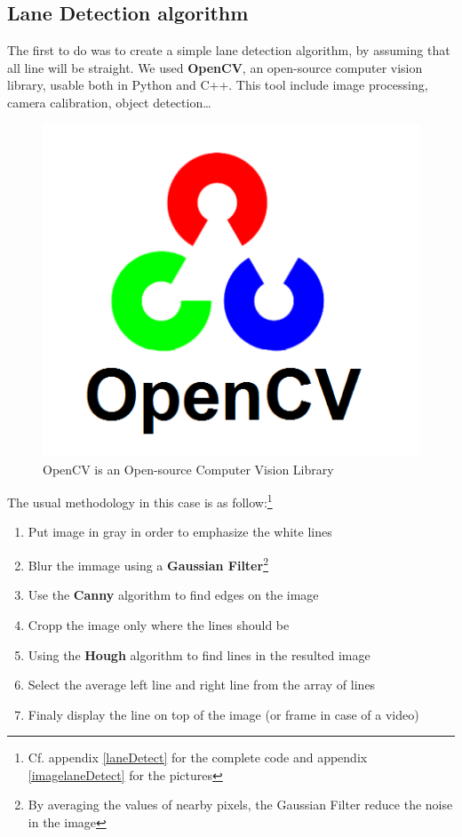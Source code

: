 \subsection{Lane Detection algorithm}

The first to do was to create a simple lane detection algorithm, by assuming that all line will be straight. We used \textbf{OpenCV}, an open-source computer vision library, usable both in Python and C++. This tool include image processing, camera calibration, object detection\dots \\

\begin{figure}[!h]
\centering
\includegraphics[scale=0.25]{img/opencv.png}
\caption{OpenCV is an Open-source Computer Vision Library}
\end{figure}

The usual methodology in this case is as follow:\footnote{Cf. appendix \ref{laneDetect} for the complete code and appendix \ref{imagelaneDetect} for the pictures}
\begin{enumerate}
\item Put image in gray in order to emphasize the white lines
\item Blur the immage using a \textbf{Gaussian Filter}\footnote{By averaging the values of nearby pixels, the Gaussian Filter reduce the noise in the image}
\item Use the \textbf{Canny} algorithm to find edges on the image
\item Cropp the image only where the lines should be
\item Using the \textbf{Hough} algorithm to find lines in the resulted image
\item Select the average left line and right line from the array of lines
\item Finaly display the line on top of the image (or frame in case of a video)
\end{enumerate}



